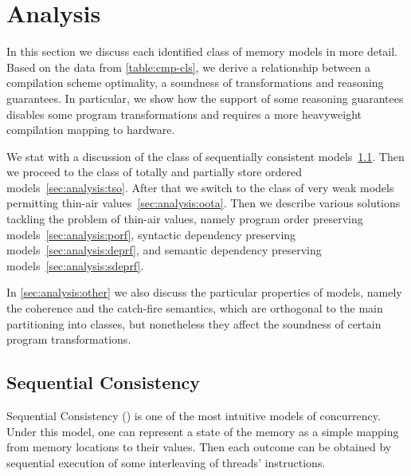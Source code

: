 \section{Analysis}
\label{sec:analysis}


In this section we discuss each identified class 
of memory models in more detail.
Based on the data from \cref{table:cmp-cls},
we derive a relationship between a compilation scheme optimality, 
a soundness of transformations and reasoning guarantees.
In particular, we show how the support of some reasoning guarantees 
disables some program transformations and requires a more heavyweight 
compilation mapping to hardware.

We stat with a discussion of the class of 
sequentially consistent models~\cref{sec:analysis:seqcst}.
Then we proceed to the class of totally and partially 
store ordered models~\cref{sec:analysis:tso}.
After that we switch to the class of very weak 
models permitting thin-air values~\cref{sec:analysis:oota}.
Then we describe various solutions tackling 
the problem of thin-air values, namely
program order preserving models~\cref{sec:analysis:porf},
syntactic dependency preserving models~\cref{sec:analysis:deprf},
and semantic dependency preserving models~\cref{sec:analysis:sdeprf}.

In \cref{sec:analysis:other} we also discuss the particular properties 
of models, namely the coherence and the catch-fire semantics, 
which are orthogonal to the main partitioning into classes, 
but nonetheless they affect the soundness of 
certain program transformations.

\subsection{Sequential Consistency}
\label{sec:analysis:seqcst}

Sequential Consistency (\SC) is one of the most intuitive models of concurrency.
Under this model, one can represent a state of the memory as 
a simple mapping from memory locations to their values. 
Then each outcome can be obtained by 
sequential execution of some interleaving of threads' instructions.

